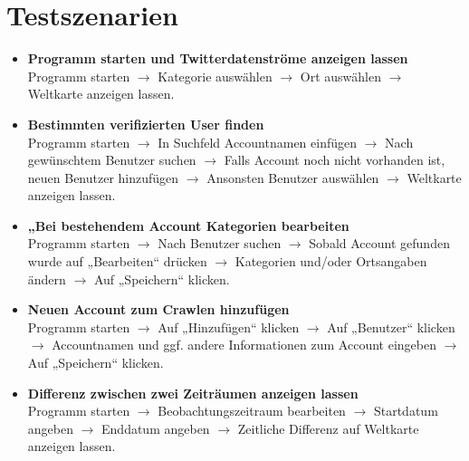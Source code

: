 \section{Testszenarien}
\begin{itemize}
	\item \textbf{Programm starten und Twitterdatenströme anzeigen lassen}\\
Programm starten $\rightarrow$ Kategorie auswählen $\rightarrow$ Ort auswählen $\rightarrow$ Weltkarte anzeigen lassen.

	\item \textbf{Bestimmten verifizierten User finden }\\
Programm starten $\rightarrow$ In Suchfeld Accountnamen einfügen $\rightarrow$ Nach gewünschtem Benutzer suchen $\rightarrow$ Falls Account noch nicht vorhanden ist, neuen Benutzer hinzufügen $\rightarrow$ Ansonsten Benutzer auswählen $\rightarrow$ Weltkarte anzeigen lassen.

	\item \textbf{„Bei bestehendem Account Kategorien bearbeiten}\\
Programm starten $\rightarrow$ Nach Benutzer suchen $\rightarrow$ Sobald Account gefunden wurde auf „Bearbeiten“ drücken $\rightarrow$ Kategorien und/oder Ortsangaben ändern $\rightarrow$ Auf „Speichern“ klicken.

	\item \textbf{Neuen Account zum Crawlen hinzufügen}\\
Programm starten $\rightarrow$ Auf „Hinzufügen“ klicken $\rightarrow$ Auf „Benutzer“ klicken $\rightarrow$ Accountnamen und ggf. andere Informationen zum Account eingeben $\rightarrow$ Auf „Speichern“ klicken.

	\item \textbf{Differenz zwischen zwei Zeiträumen anzeigen lassen}\\
Programm starten $\rightarrow$ Beobachtungszeitraum bearbeiten $\rightarrow$ Startdatum angeben $\rightarrow$ Enddatum angeben  $\rightarrow$ Zeitliche Differenz auf Weltkarte anzeigen lassen.


\end{itemize}
